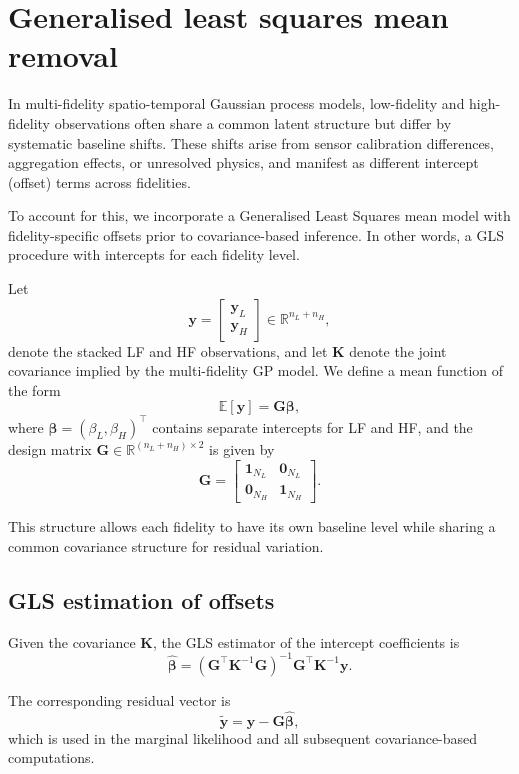 \documentclass[12pt]{article}
\begin{document}
\FloatBarrier

\section{Generalised least squares mean removal}\label{app:gls_mean}

In multi-fidelity spatio-temporal Gaussian process  models, low-fidelity and high-fidelity  observations often share a common latent structure but differ by systematic baseline shifts. These shifts arise from sensor calibration differences, aggregation effects, or unresolved physics, and manifest as different intercept (offset) terms across fidelities.

To account for this, we incorporate a Generalised Least Squares mean model with fidelity-specific offsets prior to covariance-based inference. In other words, a GLS procedure with intercepts for each fidelity level.


Let
\[
\bm{y} =
\begin{bmatrix}
\bm{y}_L \\
\bm{y}_H
\end{bmatrix}
\in \mathbb{R}^{n_L + n_H},
\]
denote the stacked LF and HF observations, and let $\bm{K}$ denote the joint covariance implied by the multi-fidelity GP model. We define a mean function of the form
\[
\mathbb{E}[\bm{y}] = \bm{G}\boldsymbol{\beta},
\]
where $\boldsymbol{\beta} = (\beta_L, \beta_H)^\top$ contains separate intercepts for LF and HF, and the design matrix $\bm{G} \in \mathbb{R}^{(n_L+n_H)\times 2}$ is given by
\[
\bm{G} =
\begin{bmatrix}
\bm{1}_{N_L} & \bm{0}_{N_L} \\
\bm{0}_{N_H} & \bm{1}_{N_H}
\end{bmatrix}.
\]

This structure allows each fidelity to have its own baseline level while sharing a common covariance structure for residual variation.

\subsection*{GLS estimation of offsets}

Given the covariance $\bm{K}$, the GLS estimator of the intercept coefficients is
\[
\hat{\boldsymbol{\beta}}
=
(\bm{G}^\top \bm{K}^{-1} \bm{G})^{-1}
\bm{G}^\top \bm{K}^{-1} \bm{y}.
\]

The corresponding residual vector is
\[
\tilde{\bm{y}}
=
\bm{y} - \bm{G}\hat{\boldsymbol{\beta}},
\]
which is used in the marginal likelihood and all subsequent covariance-based computations.
\end{document}
